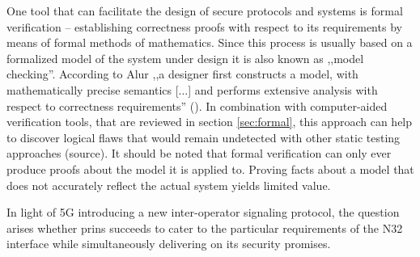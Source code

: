 One tool that can facilitate the design of secure protocols and systems is formal verification -- establishing correctness proofs with respect to its requirements by means of formal methods of mathematics.
Since this process is usually based on a formalized model of the system under design it is also known as ,,model checking''.
According to Alur ,,a designer first constructs a model, with mathematically precise semantics [...] and performs extensive analysis with respect to correctness requirements'' (\cite{alur2011formal}).
In combination with computer-aided verification tools, that are reviewed in section \ref{sec:formal}, this approach can help to discover logical flaws that would remain undetected with other static testing approaches (source).
It should be noted that formal verification can only ever produce proofs about the model it is applied to.
Proving facts about a model that does not accurately reflect the actual system yields limited value.

In light of 5G introducing a new inter-operator signaling protocol, the question arises whether \gls{prins} succeeds to cater to the particular requirements of the N32 interface while simultaneously delivering on its security promises.
